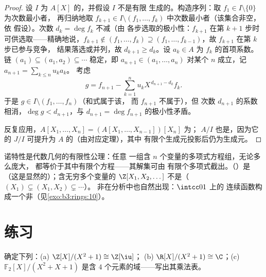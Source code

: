 \begin{proof}
设 $I$ 为 $A[X]$ 的，并假设 $I$ 不是有限
生成的。构造序列：取 $f_1 \in I \setminus \{0\}$ 为次数最小者，
再归纳地取 $f_{k+1} \in I \setminus (f_1,
\dots, f_k)$ 中次数最小者（该集合非空，依
假设）。次数 $d_k = \deg f_k$ 不减（由
各步选取的极小性：$f_{k+1}$ 在第
$k+1$ 步时可供选取——精确地说，$f_{k+1} \notin (f_1,\dots,f_k) \supseteq
(f_1, \dots, f_{k-1})$，故 $f_{k+1}$ 在第 $k$ 步已参与竞争，
结果落选或并列，故 $d_{k+1} \geq d_k$。设 $a_k \in A$ 为
$f_k$ 的首项系数。链 $(a_1) \subseteq (a_1,
a_2) \subseteq \cdots$ 稳定，即 $a_{n+1} \in (a_1, \dots,
a_n)$ 对某个 $n$ 成立，记 $a_{n+1} = \sum_{k\leq n} u_k a_k$。
考虑
\[
g = f_{n+1} - \sum_{k=1}^{n} u_k X^{\,d_{n+1} - d_k} f_k .
\]
于是 $g \in I \setminus (f_1, \dots, f_n)$（和式属于该，
而 $f_{n+1}$ 不属于），但
次数 $d_{n+1}$ 的系数相消，$\deg g < d_{n+1}$，与
$d_{n+1} = \deg f_{n+1}$ 的极小性矛盾。

反复应用，$A[X_1, \dots, X_n] = (A[X_1, \dots, X_{n-1}])[X_n]$
为； $A/I$ 也是，因为它的
$J/I$ 可提升为 $A$ 的（由对应定理），其中
有限个生成元投影后仍为生成元。
\end{proof}

\begin{remark}\label{rem:b3:rings:noethmeaning}
诺特性是代数几何的有限性公理：任意
一组含 $n$ 个变量的多项式方程组，无论多么庞大，
都等价于其中有限个方程——其解集可由
有限个多项式截出。（）是
（这是显然的）；含无穷多个变量的 $\Z[X_1, X_2, \dots]$
不是（$(X_1) \subsetneq (X_1, X_2) \subsetneq \cdots$）。
非在分析中也自然出现：$\intcc01$ 上的
连续函数构成一个非（见\cref{exo:b3:rings:10}）。
\end{remark}

\section{练习}

\begin{exercise}[$\star$]\label{exo:b3:rings:1}
确定下列：(a) $\Z[X]/(X^2 + 1) \cong \Z[\iu]$；
(b) $\R[X]/(X^2+1) \cong \C$；(c) $\mathbb F_2[X]/(X^2 + X + 1)$
是含 $4$ 个元素的域——写出其乘法表。
\end{exercise}

